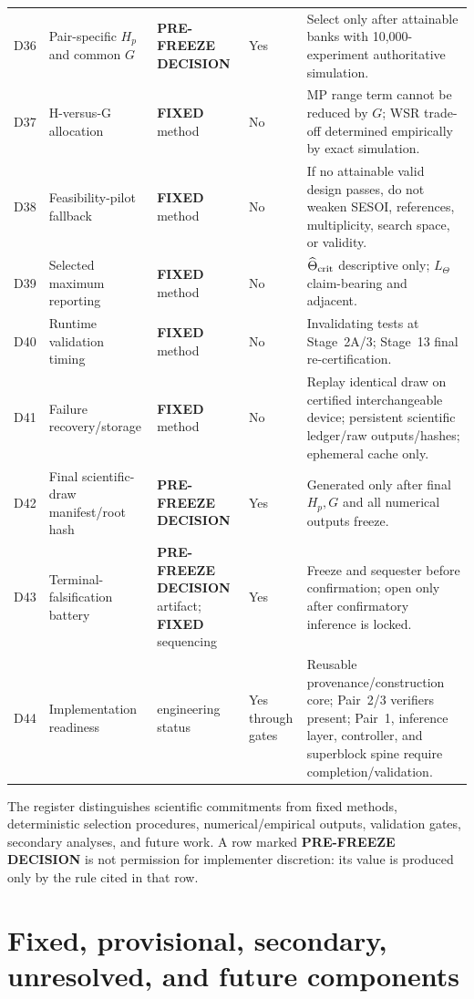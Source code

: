 \documentclass[11pt,a4paper]{article}
\newcommand{\FIXED}{\textbf{FIXED}}
\newcommand{\PFD}{\textbf{PRE-FREEZE DECISION}}
\begin{document}
\begin{longtable}{p{}p{}p{}p{}p{}}
D36 & Pair-specific $H_p$ and common $G$ & \PFD{} & Yes & Select only after attainable banks with 10,000-experiment authoritative simulation. \\
D37 & H-versus-G allocation & \FIXED{} method & No & MP range term cannot be reduced by $G$; WSR trade-off determined empirically by exact simulation. \\
D38 & Feasibility-pilot fallback & \FIXED{} method & No & If no attainable valid design passes, do not weaken SESOI, references, multiplicity, search space, or validity. \\
D39 & Selected maximum reporting & \FIXED{} method & No & $\widehat\Theta_{\rm crit}$ descriptive only; $L_\Theta$ claim-bearing and adjacent. \\
D40 & Runtime validation timing & \FIXED{} method & No & Invalidating tests at Stage~2A/3; Stage~13 final re-certification. \\
D41 & Failure recovery/storage & \FIXED{} method & No & Replay identical draw on certified interchangeable device; persistent scientific ledger/raw outputs/hashes; ephemeral cache only. \\
D42 & Final scientific-draw manifest/root hash & \PFD{} & Yes & Generated only after final $H_p,G$ and all numerical outputs freeze. \\
D43 & Terminal-falsification battery & \PFD{} artifact; \FIXED{} sequencing & Yes & Freeze and sequester before confirmation; open only after confirmatory inference is locked. \\
D44 & Implementation readiness & engineering status & Yes through gates & Reusable provenance/construction core; Pair~2/3 verifiers present; Pair~1, inference layer, controller, and superblock spine require completion/validation. \\
\bottomrule
\end{longtable}
\normalsize

The register distinguishes scientific commitments from fixed methods, deterministic selection procedures, numerical/empirical outputs, validation gates, secondary analyses, and future work. A row marked \PFD{} is not permission for implementer discretion: its value is produced only by the rule cited in that row.

\section{Fixed, provisional, secondary, unresolved, and future components}
\end{document}
